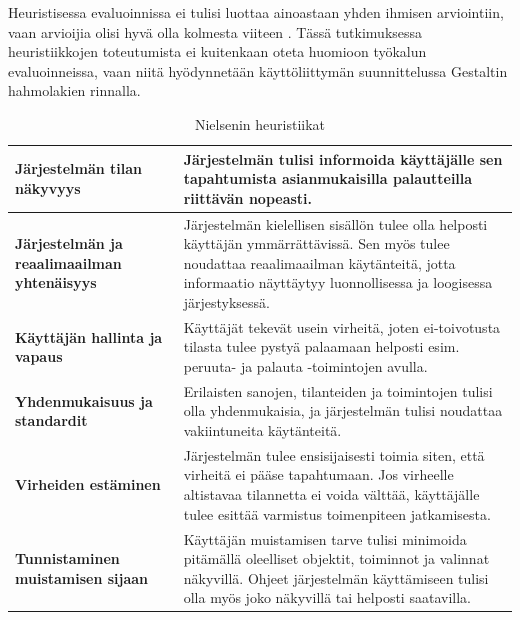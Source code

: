 \documentclass[utf8]{gradu3}
\begin{document}
Heuristisessa evaluoinnissa ei tulisi luottaa ainoastaan yhden ihmisen arviointiin, vaan arvioijia olisi hyvä olla kolmesta viiteen \parencite{heuristic-evaluation}. Tässä tutkimuksessa heuristiikkojen toteutumista ei kuitenkaan oteta huomioon työkalun evaluoinneissa, vaan niitä hyödynnetään käyttöliittymän suunnittelussa Gestaltin hahmolakien rinnalla.


\begin{table}[H]
  \centering
  \caption{Nielsenin \parencite*{heuristics} heuristiikat}
    \begin{tabular}{|p{12.355em}|p{21.855em}|}
    \hline
    
    \textbf{\textbf{Järjestelmän tilan näkyvyys}} & Järjestelmän tulisi informoida käyttäjälle sen tapahtumista asianmukaisilla palautteilla riittävän nopeasti. \\ 
    \hline
    
    \textbf{Järjestelmän ja reaalimaailman yhtenäisyys} & Järjestelmän kielellisen sisällön tulee olla helposti käyttäjän ymmärrättävissä. Sen myös tulee noudattaa reaalimaailman käytänteitä, jotta informaatio näyttäytyy luonnollisessa ja loogisessa järjestyksessä. \\
    \hline
    
    \textbf{\textbf{Käyttäjän hallinta ja vapaus}} & Käyttäjät tekevät usein virheitä, joten ei-toivotusta tilasta tulee pystyä palaamaan helposti esim. peruuta- ja palauta -toimintojen avulla. \\
    \hline
    
    \textbf{\textbf{Yhdenmukaisuus ja standardit}} & Erilaisten sanojen, tilanteiden ja toimintojen tulisi olla yhdenmukaisia, ja järjestelmän tulisi noudattaa vakiintuneita käytänteitä. \\
    \hline
    
    \textbf{\textbf{Virheiden estäminen}} & Järjestelmän tulee ensisijaisesti toimia siten, että virheitä ei pääse tapahtumaan. Jos virheelle altistavaa tilannetta ei voida välttää, käyttäjälle tulee esittää varmistus toimenpiteen jatkamisesta. \\
    \hline
    
    \textbf{Tunnistaminen muistamisen sijaan} & Käyttäjän muistamisen tarve tulisi minimoida pitämällä oleelliset objektit, toiminnot ja valinnat näkyvillä. Ohjeet järjestelmän käyttämiseen tulisi olla myös joko näkyvillä tai helposti saatavilla. \\
    \hline
    

\end{tabular}
\end{table}
\end{document}

